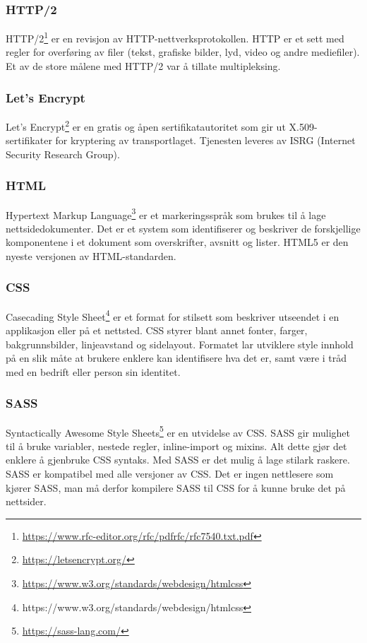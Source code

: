 \subsubsection{HTTP/2}
HTTP/2\footnote{\url{https://www.rfc-editor.org/rfc/pdfrfc/rfc7540.txt.pdf}} er en revisjon av HTTP-nettverksprotokollen. HTTP er et sett med regler for overføring av filer (tekst, grafiske bilder, lyd, video og andre mediefiler). Et av de store målene med HTTP/2 var å tillate multipleksing.

\subsubsection{Let’s Encrypt}
Let’s Encrypt\footnote{\url{https://letsencrypt.org/}} er en gratis og åpen sertifikatautoritet som gir ut X.509-sertifikater for kryptering av transportlaget. Tjenesten leveres av ISRG (Internet Security Research Group).

\subsubsection{HTML}
Hypertext Markup Language\footnote{\url{https://www.w3.org/standards/webdesign/htmlcss}} er et markeringsspråk som brukes til å lage nettsidedokumenter. Det er et system som identifiserer og beskriver de forskjellige komponentene i et dokument som overskrifter, avsnitt og lister. HTML5 er den nyeste versjonen av HTML-standarden.

\subsubsection{CSS}
Casecading Style Sheet\footnote{https://www.w3.org/standards/webdesign/htmlcss} er et format for stilsett som beskriver utseendet i en applikasjon eller på et nettsted. CSS styrer blant annet fonter, farger, bakgrunnsbilder, linjeavstand og sidelayout. Formatet lar utviklere style innhold på en slik måte at brukere enklere kan identifisere hva det er, samt være i tråd med en bedrift eller person sin identitet.

\subsubsection{SASS}
Syntactically Awesome Style Sheets\footnote{\url{https://sass-lang.com/}} er en utvidelse av CSS. SASS gir mulighet til å bruke variabler, nestede regler, inline-import og mixins. Alt dette gjør det enklere å gjenbruke CSS syntaks. Med SASS er det mulig å lage stilark raskere. SASS er kompatibel med alle versjoner av CSS. Det er ingen nettlesere som kjører SASS, man må derfor kompilere SASS til CSS for å kunne bruke det på nettsider.

